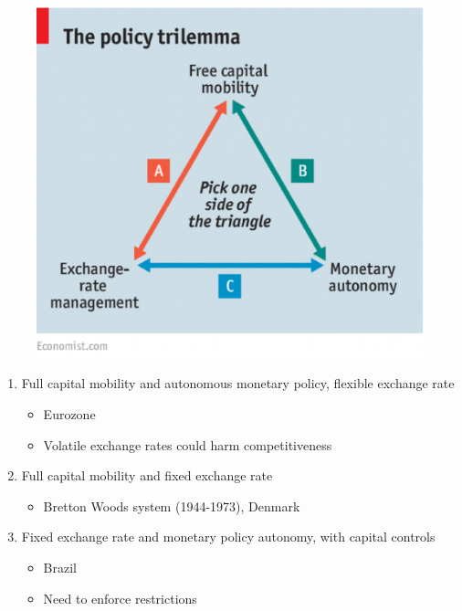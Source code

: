 \documentclass{beamer}
\begin{document}
\begin{frame}
  \begin{figure}
    \includegraphics[scale=.4]{impossible_trinity.eps}
  \end{figure}
\end{frame}



\begin{frame}
  \begin{enumerate}
    \item Full capital mobility and autonomous monetary policy, flexible exchange rate
    \begin{itemize}
      \item Eurozone
      \item Volatile exchange rates could harm competitiveness
    \end{itemize}
    \medskip
    \item Full capital mobility and fixed exchange rate
    \begin{itemize}
      \item Bretton Woods system (1944-1973), Denmark
    \end{itemize}
    \medskip
    \item Fixed exchange rate and monetary policy autonomy, with capital controls
    \begin{itemize}
      \item Brazil
      \item Need to enforce restrictions
    \end{itemize}
  \end{enumerate}
\end{frame}
\end{document}
